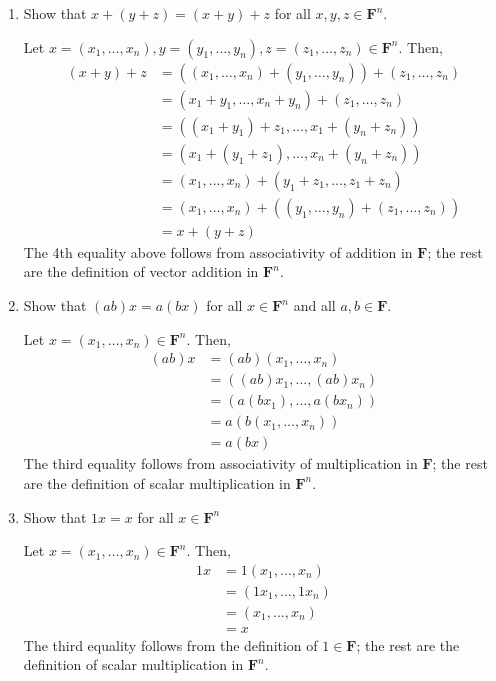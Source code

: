 \documentclass{book}
\begin{document}
\begin{enumerate}
\item Show that \(x+(y+z)=(x+y)+z\) for all \(x,y,z \in \textbf{F}^n\).

Let \(x=(x_1,\dots,x_n), y=(y_1,\dots,y_n), z=(z_1,\dots,z_n) \in \textbf{F}^n\).  Then,
\begin{equation*}
\begin{split}
(x+y)+z &= ((x_1,\dots,x_n)+(y_1,\dots,y_n))+(z_1,\dots,z_n) \\
&= (x_1+y_1,\dots,x_n+y_n)+(z_1,\dots,z_n) \\
&=((x_1+y_1)+z_1,\dots,x_1+(y_n+z_n)) \\
&=(x_1+(y_1+z_1),\dots,x_n+(y_n+z_n)) \\
&= (x_1,\dots,x_n)+(y_1+z_1,\dots,z_1+z_n) \\
&= (x_1,\dots,x_n)+((y_1,\dots,y_n)+(z_1,\dots,z_n)) \\
&= x+(y+z)
\end{split}
\end{equation*}
The 4th equality above follows from associativity of addition in \(\textbf{F}\); the rest are the definition of vector addition in \(\textbf{F}^n\).

\item Show that \((ab)x=a(bx)\) for all \(x \in \textbf{F}^n\) and all \(a,b \in \textbf{F}\).

Let \(x = (x_1,\dots,x_n) \in \textbf{F}^n\).  Then,
\begin{equation*}
\begin{split}
(ab)x &= (ab)(x_1,\dots,x_n) \\
&= ((ab)x_1,\dots,(ab)x_n) \\
&=(a(bx_1),\dots,a(bx_n)) \\
&=a(b(x_1,\dots,x_n)) \\
&=a(bx)
\end{split}
\end{equation*}
The third equality follows from associativity of multiplication in \(\textbf{F}\); the rest are the definition of scalar multiplication in \(\textbf{F}^n\).

\item Show that \(1x=x\) for all \(x \in \textbf{F}^n\)

Let \(x = (x_1,\dots,x_n) \in \textbf{F}^n\).  Then,
\begin{equation*}
\begin{split}
1x &= 1(x_1,\dots,x_n) \\
&= (1x_1,\dots,1x_n) \\
&=(x_1,\dots,x_n) \\
&=x
\end{split}
\end{equation*}
The third equality follows from the definition of \(1 \in \textbf{F}\); the rest are the definition of scalar multiplication in \(\textbf{F}^n\).


\end{enumerate}
\end{document}
